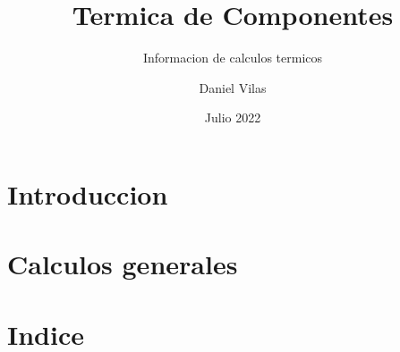 \documentclass[spanish]{DccDiyTools/DccDiyTools}
\title{Termica de Componentes}
\subtitle{Informacion de calculos termicos}
\author{Daniel Vilas}
\date{Julio 2022}
\begin{document}
\maketitle
\newpage
\section{Introduccion}


\newpage
\section{Calculos generales}


\newpage
\section{Indice}
\tableofcontents

\listoffigures
\listoftables



\end{document}
